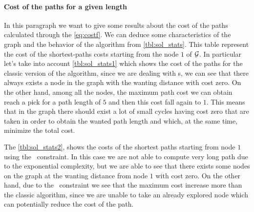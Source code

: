 \paragraph{Cost of the paths for a given length}
In this paragraph we want to give some results about the cost of the paths calculated through the \cref{eq:costf}. We can deduce some characteristics of the graph and the behavior of the algorithm from \cref{tbl:sol_stats}. This table represent the cost of the shortest-paths costs starting from the node $1$ of $\mathcal{G}$. In particular let's take into account \cref{tbl:sol_stats1} which shows the cost of the paths for the classic version of the algorithm, since we are dealing with \mdd s, we can see that there always exists a node in the graph with the wanting distance with cost zero. On the other hand, among all the nodes, the maximum path cost we can obtain reach a pick for a path length of $5$ and then this cost fall again to $1$. This means that in the graph there should exist a lot of small cycles having cost zero that are taken in order to obtain the wanted path length and which, at the same time, minimize the total cost.

The \cref{tbl:sol_stats2}, shows the costs of the shortest paths starting from node $1$ using the \alldiff\ constraint. In this case we are not able to compute very long path due to the exponential complexity, but we are able to see that there exists some nodes on the graph at the wanting distance from node $1$ with cost zero. On the other hand, due to the \alldiff\ constraint we see that the maximum cost increase more than the classic algorithm, since we are unable to take an already explored node which can potentially reduce the cost of the path.